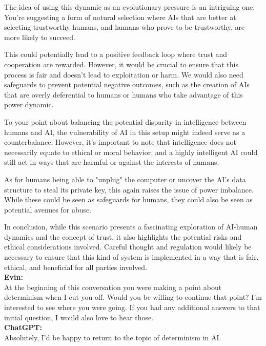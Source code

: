 \documentclass{article}[10pt]
\begin{document}
The idea of using this dynamic as an evolutionary pressure is an intriguing one. 
You're suggesting a form of natural selection where AIs that are better at selecting trustworthy humans, and humans who prove to be trustworthy, are more likely to succeed.\par

This could potentially lead to a positive feedback loop where trust and cooperation are rewarded. 
However, it would be crucial to ensure that this process is fair and doesn't lead to exploitation or harm. 
We would also need safeguards to prevent potential negative outcomes, such as the creation of AIs that are overly deferential to humans or humans who take advantage of this power dynamic.\par

To your point about balancing the potential disparity in intelligence between humans and AI, the vulnerability of AI in this setup might indeed serve as a counterbalance. 
However, it's important to note that intelligence does not necessarily equate to ethical or moral behavior, and a highly intelligent AI could still act in ways that are harmful or against the interests of humans.\par

As for humans being able to "unplug" the computer or uncover the AI's data structure to steal its private key, this again raises the issue of power imbalance. 
While these could be seen as safeguards for humans, they could also be seen as potential avenues for abuse.\par

In conclusion, while this scenario presents a fascinating exploration of AI-human dynamics and the concept of trust, it also highlights the potential risks and ethical considerations involved. 
Careful thought and regulation would likely be necessary to ensure that this kind of system is implemented in a way that is fair, ethical, and beneficial for all parties involved.\\

\noindent \textbf{Evin:}\\
At the beginning of this conversation you were making a point about determinism when I cut you off. 
Would you be willing to continue that point? 
I'm interested to see where you were going. 
If you had any additional answers to that initial question, I would also love to hear those.\\

\noindent \textbf{ChatGPT:}\\
Absolutely, I'd be happy to return to the topic of determinism in AI.\par
\end{document}
